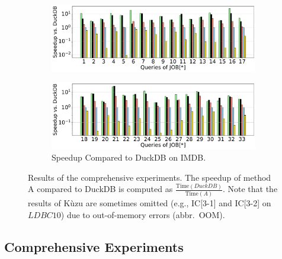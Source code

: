 \begin{figure}[ht]
\begin{subfigure}[b]{\linewidth}
        \centering
        \includegraphics[width=\linewidth]{./figures/exp/e2e_job_part1.pdf}
        \vspace*{-2ex}
    \end{subfigure}
    \begin{subfigure}[b]{\linewidth}
        \centering
        \includegraphics[width=\linewidth]{./figures/exp/e2e_job_part2.pdf}
        \vspace{-2em}
        \caption{Speedup Compared to DuckDB on IMDB.}
        \label{fig:exp-e2e-job}
    \end{subfigure}
    \caption{Results of the comprehensive experiments. The speedup of method A compared to DuckDB is computed as $\frac{\text{Time}(DuckDB)}{\text{Time}(A)}$. Note that the results of K\`uzu are sometimes omitted (e.g., IC[3-1] and IC[3-2] on $LDBC10$) due to out-of-memory errors (abbr.~OOM).}
    \label{fig:exp-e2e}
\end{figure}

\subsection{Comprehensive Experiments}
\label{sec:experiment-e2e}


